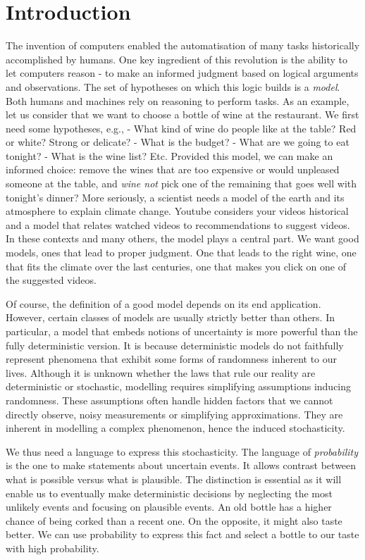 \section{Introduction}
The invention of computers enabled the automatisation of many tasks historically accomplished by humans. One key ingredient of this revolution is the ability to let computers reason - to make an informed judgment based on logical arguments and observations. The set of hypotheses on which this logic builds is a \textit{model}. Both humans and machines rely on reasoning to perform tasks. As an example, let us consider that we want to choose a bottle of wine at the restaurant. We first need some hypotheses, e.g., - What kind of wine do people like at the table? Red or white? Strong or delicate? - What is the budget? - What are we going to eat tonight? - What is the wine list? Etc. Provided this model, we can make an informed choice: remove the wines that are too expensive or would unpleased someone at the table, and \textit{wine not} pick one of the remaining that goes well with tonight's dinner? More seriously, a scientist needs a model of the earth and its atmosphere to explain climate change. Youtube considers your videos historical and a model that relates watched videos to recommendations to suggest videos. In these contexts and many others, the model plays a central part. We want good models, ones that lead to proper judgment. One that leads to the right wine, one that fits the climate over the last centuries, one that makes you click on one of the suggested videos.

Of course, the definition of a good model depends on its end application. However, certain classes of models are usually strictly better than others.
In particular, a model that embeds notions of uncertainty is more powerful than the fully deterministic version. It is because deterministic models do not faithfully represent phenomena that exhibit some forms of randomness inherent to our lives. Although it is unknown whether the laws that rule our reality are deterministic or stochastic, modelling requires simplifying assumptions inducing randomness. These assumptions often handle hidden factors that we cannot directly observe, noisy measurements or simplifying approximations. They are inherent in modelling a complex phenomenon, hence the induced stochasticity.

We thus need a language to express this stochasticity. The language of \textit{probability} is the one to make statements about uncertain events. It allows contrast between what is possible versus what is plausible. The distinction is essential as it will enable us to eventually make deterministic decisions by neglecting the most unlikely events and focusing on plausible events. An old bottle has a higher chance of being corked than a recent one. On the opposite, it might also taste better. We can use probability to express this fact and select a bottle to our taste with high probability.

